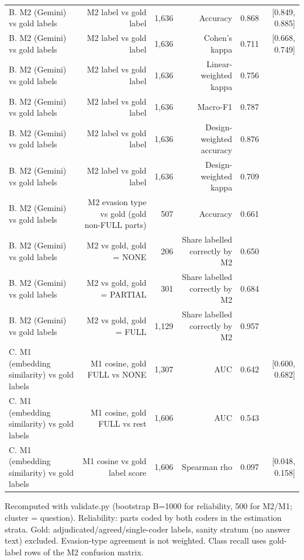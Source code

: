 \begin{table}[ht]
\begin{tabular}{lrrrrr}
B. M2 (Gemini) vs gold labels & M2 label vs gold label & 1,636 & Accuracy & 0.868 & {[}0.849, 0.885] \\
B. M2 (Gemini) vs gold labels & M2 label vs gold label & 1,636 & Cohen's kappa & 0.711 & {[}0.668, 0.749] \\
B. M2 (Gemini) vs gold labels & M2 label vs gold label & 1,636 & Linear-weighted kappa & 0.756 &  \\
B. M2 (Gemini) vs gold labels & M2 label vs gold label & 1,636 & Macro-F1 & 0.787 &  \\
B. M2 (Gemini) vs gold labels & M2 label vs gold label & 1,636 & Design-weighted accuracy & 0.876 &  \\
B. M2 (Gemini) vs gold labels & M2 label vs gold label & 1,636 & Design-weighted kappa & 0.709 &  \\
B. M2 (Gemini) vs gold labels & M2 evasion type vs gold (gold non-FULL parts) & 507 & Accuracy & 0.661 &  \\
B. M2 (Gemini) vs gold labels & M2 vs gold, gold = NONE & 206 & Share labelled correctly by M2 & 0.650 &  \\
B. M2 (Gemini) vs gold labels & M2 vs gold, gold = PARTIAL & 301 & Share labelled correctly by M2 & 0.684 &  \\
B. M2 (Gemini) vs gold labels & M2 vs gold, gold = FULL & 1,129 & Share labelled correctly by M2 & 0.957 &  \\
C. M1 (embedding similarity) vs gold labels & M1 cosine, gold FULL vs NONE & 1,307 & AUC & 0.642 & {[}0.600, 0.682] \\
C. M1 (embedding similarity) vs gold labels & M1 cosine, gold FULL vs rest & 1,606 & AUC & 0.543 &  \\
C. M1 (embedding similarity) vs gold labels & M1 cosine vs gold label score & 1,606 & Spearman rho & 0.097 & {[}0.048, 0.158] \\
\bottomrule
\end{tabular}
\par\footnotesize Recomputed with validate.py (bootstrap B=1000 for reliability, 500 for M2/M1; cluster = question). Reliability: parts coded by both coders in the estimation strata. Gold: adjudicated/agreed/single-coder labels, sanity stratum (no answer text) excluded. Evasion-type agreement is not weighted. Class recall uses gold-label rows of the M2 confusion matrix.
\end{table}
